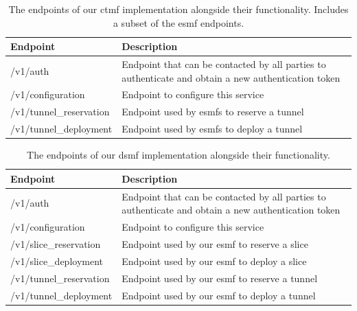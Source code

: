 \begin{table}[htp]
    \begin{tabularx}{\textwidth}{ |l|X| }
        \hline
        \textbf{Endpoint}       & \textbf{Description}                                                                                \\
        \hline
        /v1/auth                & Endpoint that can be contacted by all parties to authenticate and obtain a new authentication token \\
        /v1/configuration       & Endpoint to configure this service                                                                  \\
        \hline
        /v1/tunnel\_reservation & Endpoint used by \acrshort{esmf}s to reserve a tunnel                                               \\
        /v1/tunnel\_deployment  & Endpoint used by \acrshort{esmf}s to deploy a tunnel                                                \\
        \hline
    \end{tabularx}
    \caption[\acrshort{ctmf} endpoints]{The endpoints of our \acrshort{ctmf} implementation alongside their functionality. Includes a subset of the \acrshort{esmf} endpoints.}
    \label{table:ctmf}
\end{table}

\begin{table}[htp]
    \begin{tabularx}{\textwidth}{ |l|X| }
        \hline
        \textbf{Endpoint}       & \textbf{Description}                                                                                \\
        \hline
        /v1/auth                & Endpoint that can be contacted by all parties to authenticate and obtain a new authentication token \\
        /v1/configuration       & Endpoint to configure this service                                                                  \\
        \hline
        /v1/slice\_reservation  & Endpoint used by our \acrshort{esmf} to reserve a slice                                             \\
        /v1/slice\_deployment   & Endpoint used by our \acrshort{esmf} to deploy a slice                                              \\
        /v1/tunnel\_reservation & Endpoint used by our \acrshort{esmf} to reserve a tunnel                                            \\
        /v1/tunnel\_deployment  & Endpoint used by our \acrshort{esmf} to deploy a tunnel                                             \\
        \hline
    \end{tabularx}
    \caption[\acrshort{dsmf} endpoints]{The endpoints of our \acrshort{dsmf} implementation alongside their functionality.}
    \label{table:dsmf}
\end{table}

